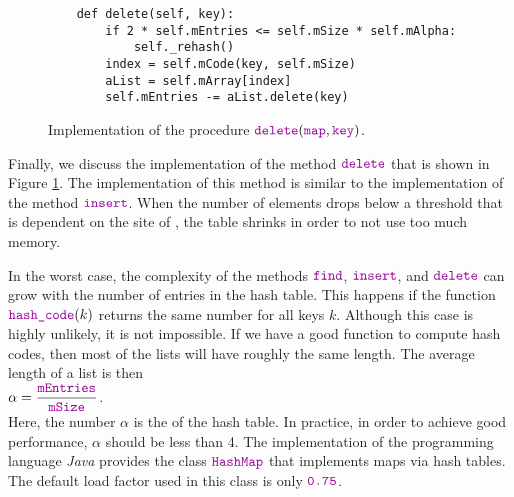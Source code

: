 \begin{figure}[!ht]
\centering
\begin{verbatim}
    def delete(self, key):
        if 2 * self.mEntries <= self.mSize * self.mAlpha:
            self._rehash()
        index = self.mCode(key, self.mSize)
        aList = self.mArray[index]
        self.mEntries -= aList.delete(key)
\end{verbatim}
\vspace*{-0.3cm}
\caption{Implementation of the procedure $\mytt{delete}(\mytt{map}, \mytt{key})$.}
\label{fig:HashMap.ipynb-delete}
\end{figure}

Finally, we discuss the implementation of the method $\mytt{delete}$ that is shown in Figure
\ref{fig:HashMap.ipynb-delete}.  The implementation of this method is similar to the implementation
of the method $\mytt{insert}$.  When the number of elements drops below a threshold that is dependent on the
site of , the table shrinks in order to not use too much memory.

In the worst case, the complexity of
the methods  $\mytt{find}$, $\mytt{insert}$, and $\mytt{delete}$ can grow  with the number
of entries in the hash table.  This happens if the function 
$\mytt{hash\_code}(k)$ returns the same number for all keys $k$.  Although this case is
highly unlikely, it is not impossible.  If we have a good function to compute hash codes, then
most of the  lists will have roughly the same length.  The average length of a list is then
 \\[0.2cm]
\hspace*{1.3cm}
 $\alpha = \ds \frac{\mytt{mEntries}}{\mytt{mSize}}$. 
\\[0.2cm]
Here, the number $\alpha$ is the  of the hash table.  In practice, in order to
achieve good performance, $\alpha$ should be less than 4.  The implementation of the programming
language \textsl{Java} provides the class  $\mytt{HashMap}$ that implements maps via hash tables.
The default load factor used in this class is only $\mytt{0.75}$.

